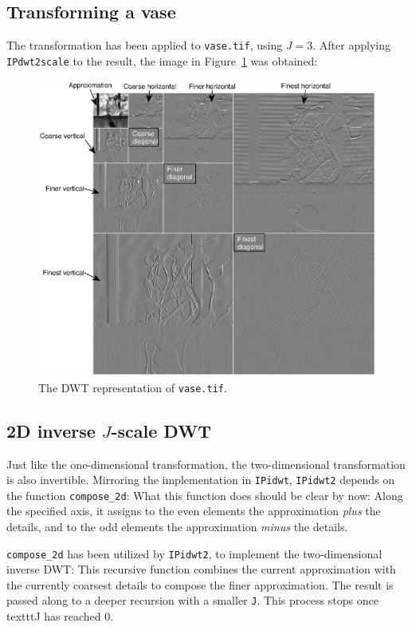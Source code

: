 \subsection{Transforming a vase}
The transformation has been applied to \texttt{vase.tif}, using \(J=3\).
After applying \texttt{IPdwt2scale} to the result, the image in Figure~\ref{fig:vase_dwt} was obtained:
\begin{figure}[htb]
 \centering
 \includegraphics[width=\linewidth]{labeled_vase_dwt.eps}
 \caption{The DWT representation of \texttt{vase.tif}.}
 \label{fig:vase_dwt}
\end{figure}

\clearpage

\subsection{\texorpdfstring{2D inverse \(J\)-scale DWT}{2D inverse J-scale DWT}}
Just like the one-dimensional transformation, the two-dimensional transformation is also invertible.
Mirroring the implementation in \texttt{IPidwt}, \texttt{IPidwt2} depends on the function \texttt{compose\_2d}:
What this function does should be clear by now: Along the specified axis, it assigns to the even elements the approximation \emph{plus} the details, and to the odd elements the approximation \emph{minus} the details.

\texttt{compose\_2d} has been utilized by \texttt{IPidwt2}, to implement the two-dimensional inverse DWT:
This recursive function combines the current approximation with the currently coarsest details to compose the finer approximation.
The result is passed along to a deeper recursion with a smaller \texttt{J}.
This process stops once texttt{J} has reached 0.

